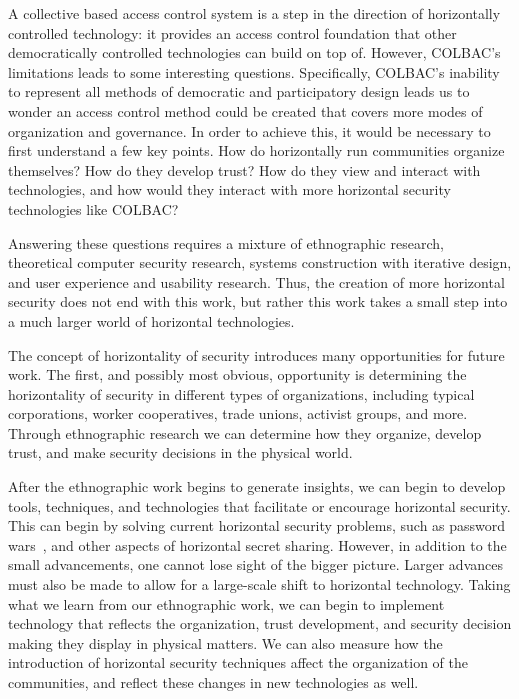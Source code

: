 A collective based access control system is a step in the direction of
horizontally controlled technology: it provides an access control foundation
that other democratically controlled technologies can build on top of. However,
COLBAC's limitations leads to some interesting questions. Specifically, COLBAC's
inability to represent all methods of democratic and participatory design leads
us to wonder an access control method could be created that covers more modes of
organization and governance. In order to achieve this, it would be necessary to
first understand a few key points. How do horizontally run communities organize
themselves? How do they develop trust? How do they view and interact with
technologies, and how would they interact with more horizontal security
technologies like COLBAC?

Answering these questions requires a mixture of ethnographic research,
theoretical computer security research, systems construction with iterative
design, and user experience and usability research. Thus, the creation of more
horizontal security does not end with this work, but rather this work takes a
small step into a much larger world of horizontal technologies.

The concept of horizontality of security introduces many opportunities for
future work. The first, and possibly most obvious, opportunity is determining
the horizontality of security in different types of organizations, including
typical corporations, worker cooperatives, trade unions, activist groups, and
more. Through ethnographic research we can determine how they organize, develop
trust, and make security decisions in the physical world.

After the ethnographic work begins to generate insights, we can begin to develop
tools, techniques, and technologies that facilitate or encourage horizontal
security. This can begin by solving current horizontal security problems, such
as password wars~\cite{kavada2020counterpublics}, and other aspects of 
horizontal secret sharing. However, in addition to the small advancements, one
cannot lose sight of the bigger picture. Larger advances must also be made to
allow for a large-scale shift to horizontal technology. Taking what we learn
from our ethnographic work, we can begin to implement technology that reflects
the organization, trust development, and security decision making they display
in physical matters. We can also measure how the introduction of horizontal
security techniques affect the organization of the communities, and reflect
these changes in new technologies as well.

